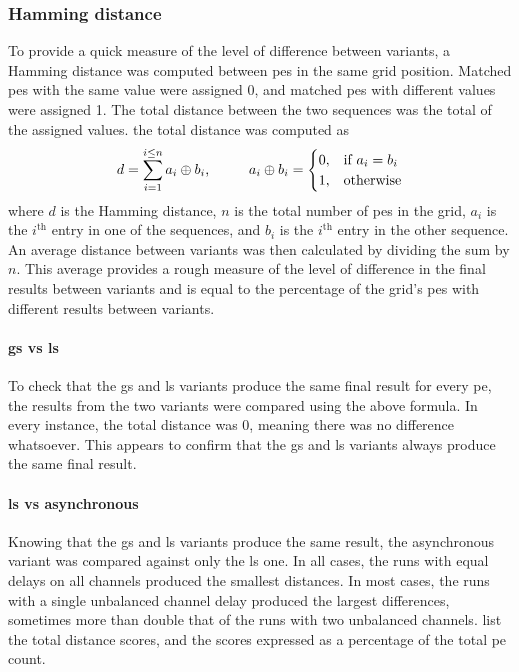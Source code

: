 \subsubsection{Hamming distance}
To provide a quick measure of the level of difference between variants, a Hamming distance was computed between \glspl{pe} in the same grid position.  Matched \glspl{pe} with the same value were assigned 0, and matched \glspl{pe} with different values were assigned 1.  The total distance between the two sequences was the total of the assigned values.  \Ie{} the total distance was computed as \[d = \sum_{i = 1}^{i \leq n} a_i \oplus b_i\text{,}
\hspace{1.0cm}%
a_i \oplus b_i = \begin{cases}
    0, & \text{if } a_i = b_i \\
    1, & \text{otherwise}
\end{cases}
\] where \(d\) is the Hamming distance, \(n\) is the total number of \glspl{pe} in the grid, \(a_i\) is the \(i^{\text{th}}\) entry in one of the sequences, and \(b_i\) is the \(i^{\text{th}}\) entry in the other sequence.  An average distance between variants was then calculated by dividing the sum by \(n\).  This average provides a rough measure of the level of difference in the final results between variants and is equal to the percentage of the grid's \glspl{pe} with different results between variants.

\paragraph{\Gls{gs} vs \gls{ls}}
To check that the \gls{gs} and \gls{ls} variants produce the same final result for every \gls{pe}, the results from the two variants were compared using the above formula.  In every instance, the total distance was 0, meaning there was no difference whatsoever.  This appears to confirm that the \gls{gs} and \gls{ls} variants always produce the same final result.

\paragraph{\Gls{ls} vs asynchronous}
Knowing that the \gls{gs} and \gls{ls} variants produce the same result, the asynchronous variant was compared against only the \gls{ls} one.  In all cases, the runs with equal delays on all channels produced the smallest distances.  In most cases, the runs with a single unbalanced channel delay produced the largest differences, sometimes more than double that of the runs with two unbalanced channels.   list the total distance scores, and the scores expressed as a percentage of the total \gls{pe} count.

